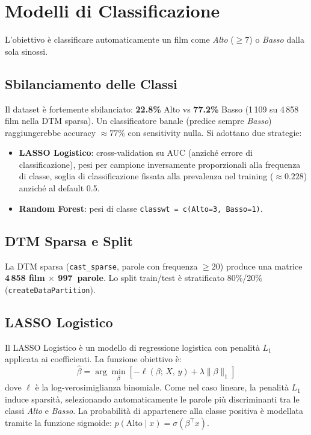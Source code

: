\documentclass[12pt, a4paper]{article}
\newcommand{\code}[1]{\texttt{#1}}
\begin{document}
\section{Modelli di Classificazione}

L'obiettivo è classificare automaticamente un film come
\textit{Alto} ($\geq 7$) o \textit{Basso} dalla sola sinossi.

\subsection{Sbilanciamento delle Classi}

Il dataset è fortemente sbilanciato:
\textbf{22.8\%} Alto vs \textbf{77.2\%} Basso
(1\,109 su 4\,858 film nella DTM sparsa).
Un classificatore banale (predice sempre \textit{Basso})
raggiungerebbe accuracy $\approx 77\%$ con sensitivity nulla.
Si adottano due strategie:

\begin{itemize}[leftmargin=1.8em]
  \item \textbf{LASSO Logistico}: cross-validation su AUC
        (anziché errore di classificazione), pesi per
        campione inversamente proporzionali alla frequenza di
        classe, soglia di classificazione fissata alla
        prevalenza nel training ($\approx 0.228$) anziché
        al default 0.5.
  \item \textbf{Random Forest}: pesi di classe
        \code{classwt = c(Alto=3, Basso=1)}.
\end{itemize}

\subsection{DTM Sparsa e Split}

La DTM sparsa (\code{cast\_sparse}, parole con
frequenza $\geq 20$) produce una matrice
\textbf{4\,858 film $\times$ 997~parole}.
Lo split train/test è stratificato 80\%/20\%
(\code{createDataPartition}).

\subsection{LASSO Logistico}

\begin{defbox}
Il LASSO Logistico è un modello di regressione logistica con
penalità $L_1$ applicata ai coefficienti. La funzione obiettivo
è:
\[
  \hat{\beta} = \arg\min_\beta \left[
    -\ell(\beta;\, X,\, y) + \lambda \|\beta\|_1
  \right]
\]
dove $\ell$ è la log-verosimiglianza binomiale. Come nel caso
lineare, la penalità $L_1$ induce sparsità, selezionando
automaticamente le parole più discriminanti tra le classi
\textit{Alto} e \textit{Basso}. La probabilità di appartenere
alla classe positiva è modellata tramite la funzione sigmoide:
$p(\text{Alto} \mid x) = \sigma(\beta^\top x)$.
\end{defbox}
\end{document}
